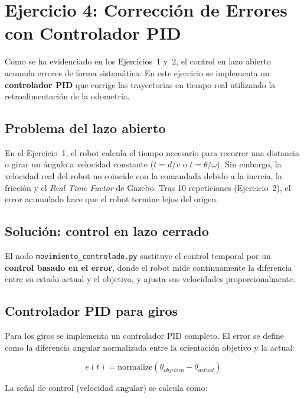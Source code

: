 \section{Ejercicio 4: Corrección de Errores con Controlador PID}

Como se ha evidenciado en los Ejercicios~1 y~2, el control en lazo abierto acumula errores de forma sistemática. En este ejercicio se implementa un \textbf{controlador PID} que corrige las trayectorias en tiempo real utilizando la retroalimentación de la odometría.

\subsection*{Problema del lazo abierto}

En el Ejercicio~1, el robot calcula el tiempo necesario para recorrer una distancia o girar un ángulo a velocidad constante ($t = d/v$ o $t = \theta/\omega$). Sin embargo, la velocidad real del robot no coincide con la comandada debido a la inercia, la fricción y el \textit{Real Time Factor} de Gazebo. Tras 10 repeticiones (Ejercicio~2), el error acumulado hace que el robot termine lejos del origen.

\subsection*{Solución: control en lazo cerrado}

El nodo \texttt{movimiento\_controlado.py} sustituye el control temporal por un \textbf{control basado en el error}, donde el robot mide continuamente la diferencia entre su estado actual y el objetivo, y ajusta sus velocidades proporcionalmente.

\subsection*{Controlador PID para giros}

Para los giros se implementa un controlador PID completo. El error se define como la diferencia angular normalizada entre la orientación objetivo y la actual:

\begin{equation}
	e(t) = \text{normalize}\left(\theta_{objetivo} - \theta_{actual}\right)
\end{equation}

La señal de control (velocidad angular) se calcula como:

